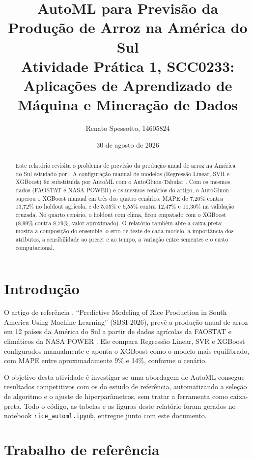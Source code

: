 \documentclass[a4paper,11pt]{article}
\title{AutoML para Previsão da Produção de Arroz na América do Sul \\
\large Atividade Prática 1, SCC0233: Aplicações de Aprendizado de Máquina e Mineração de Dados}
\author{Renato Spessotto, 14605824}
\date{30 de agosto de 2026}
\begin{document}
\maketitle

\begin{abstract}
\noindent Este relatório revisita o problema de previsão da produção anual de arroz
na América do Sul estudado por \citet{grion2026rice}. A configuração manual de modelos
(Regressão Linear, SVR e XGBoost) foi substituída por AutoML com o AutoGluon-Tabular
\citep{erickson2020autogluon}. Com os mesmos dados (FAOSTAT e NASA POWER) e os mesmos
cenários do artigo, o AutoGluon superou o XGBoost manual em três dos quatro cenários:
MAPE de 7,20\% contra 13,72\% no holdout agrícola, e de 5,05\% e 6,55\% contra 12,47\% e
11,30\% na validação cruzada. No quarto cenário, o holdout com clima, ficou empatado com o
XGBoost (8,99\% contra 8,79\%, valor aproximado). O relatório também abre a caixa-preta:
mostra a composição do ensemble, o erro de teste de cada modelo, a importância dos
atributos, a sensibilidade ao preset e ao tempo, a variação entre sementes e o custo
computacional.
\end{abstract}

\section{Introdução}

O artigo de referência \citep{grion2026rice}, ``Predictive Modeling of Rice
Production in South America Using Machine Learning'' (SBSI 2026), prevê a produção
anual de arroz em 12 países da América do Sul a partir de dados agrícolas da
FAOSTAT \citep{faostat2025} e climáticos da NASA POWER \citep{nasapower2018}.
Ele compara Regressão Linear, SVR e XGBoost configurados manualmente e aponta o XGBoost
como o modelo mais equilibrado, com MAPE entre aproximadamente 9\% e 14\%, conforme o
cenário.

O objetivo desta atividade é investigar se uma abordagem de AutoML consegue
resultados competitivos com os do estudo de referência, automatizando a seleção de
algoritmo e o ajuste de hiperparâmetros, sem tratar a ferramenta como caixa-preta.
Todo o código, as tabelas e as figuras deste relatório foram gerados no notebook
\texttt{rice\_automl.ipynb}, entregue junto com este documento.

\section{Trabalho de referência}
\end{document}
